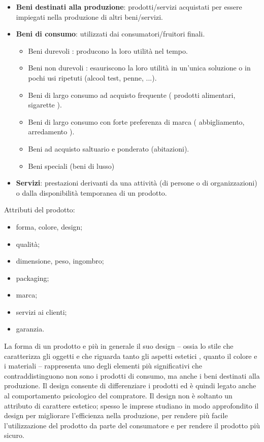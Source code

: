\begin{itemize}
	\item \textbf{Beni destinati alla produzione}: prodotti/servizi acquistati per essere impiegati nella produzione di altri beni/servizi.
	\item \textbf{Beni di consumo}: utilizzati dai consumatori/fruitori finali.
	\begin{itemize}
		\item Beni durevoli : producono la loro utilità nel tempo.
		\item Beni non durevoli : esauriscono la loro utilità in un’unica
		soluzione o in pochi usi ripetuti (alcool test, penne, ...).
		\item Beni di largo consumo ad acquisto frequente ( prodotti alimentari, sigarette ).
		\item Beni di largo consumo con forte preferenza di marca
		( abbigliamento, arredamento ).
		\item Beni ad acquisto saltuario e ponderato (abitazioni).
		\item Beni speciali (beni di lusso)
	\end{itemize}
    \item \textbf{Servizi}: prestazioni derivanti da una attività (di persone o di organizzazioni) o dalla disponibilità temporanea di un prodotto.
\end{itemize}
Attributi del prodotto:
\begin{itemize}
	\item forma, colore, design;
	\item qualità;
	\item dimensione, peso, ingombro;
	\item packaging;
	\item marca;
	\item servizi ai clienti;
	\item garanzia.
\end{itemize}
La forma di un prodotto e più in generale il suo design – ossia lo stile che caratterizza gli oggetti e che riguarda tanto gli aspetti estetici , quanto il colore e i materiali – rappresenta uno degli elementi più significativi che contraddistinguono non sono i prodotti di consumo, ma anche i beni destinati alla produzione. \newline
Il design consente di differenziare i prodotti ed è quindi legato anche al comportamento psicologico del compratore. \newline
Il design non è soltanto un attributo di carattere estetico; spesso le imprese studiano in modo approfondito il design per migliorare l’efficienza nella produzione, per rendere più facile l’utilizzazione del prodotto da parte del consumatore e per rendere il prodotto più sicuro. \newline
